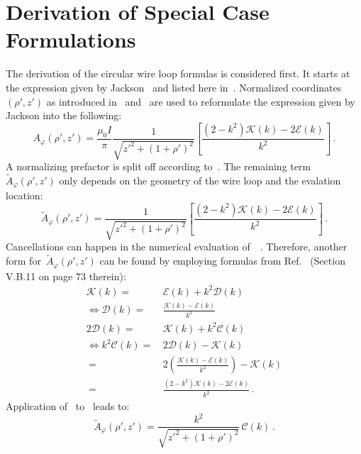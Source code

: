 \section{Derivation of Special Case Formulations}
\label{apx:derivation_of_special_case_formulations}
The derivation of the circular wire loop formulas is considered first.
It starts at the expression given by Jackson~\cite{jackson}
and listed here in~.
Normalized coordinates~$(\rho', z')$ as introduced in~ and~
are used to reformulate the expression given by Jackson into the following:
\begin{equation}
 A_\varphi(\rho', z')
   = \frac{\mu_0 I}{\pi}
     \frac{1}{\sqrt{z'^2 + (1 + \rho')^2}}
     \left[ \frac{(2 - k^2)\mathcal{K}(k) - 2 \mathcal{E}(k)}{k^2} \right] \, . \label{eqn:cwl_A_phi_initial}
\end{equation}
A normalizing prefactor is split off according to~.
The remaining term~$\tilde{A}_\varphi(\rho',z')$ only depends on the geometry of the wire loop
and the evalation location:
\begin{equation}
  \tilde{A}_\varphi(\rho', z')
  = \frac{1}{\sqrt{z'^2 + (1 + \rho')^2}}
    \left[ \frac{(2 - k^2)\mathcal{K}(k) - 2 \mathcal{E}(k)}{k^2} \right] \, . \label{eqn:aNormJackson}
\end{equation}
Cancellations can happen in the numerical evaluation of~~\cite{bulirsch_3}.
Therefore, another form for~$\tilde{A}_\varphi(\rho',z')$ can be found by employing
formulas from Ref.~\cite{jahnke_emde} (Section V.B.11 on page 73 therein):
\begin{align}
                 \mathcal{K}(k) =&\, \mathcal{E}(k) + k^2 \mathcal{D}(k) \nonumber \\
 \Leftrightarrow \mathcal{D}(k) =&\, \frac{\mathcal{K}(k) - \mathcal{E}(k)}{k^2} \\
               2 \mathcal{D}(k) =&\, \mathcal{K}(k) + k^2 \mathcal{C}(k) \nonumber \\
 \Leftrightarrow k^2 \mathcal{C}(k) =&\, 2 \mathcal{D}(k) - \mathcal{K}(k) \nonumber \\
                     ~              =&\, 2 \left( \frac{\mathcal{K}(k) - \mathcal{E}(k)}{k^2} \right) - \mathcal{K}(k) \nonumber \\
                     ~              =&\, \frac{(2 - k^2) \mathcal{K}(k) - 2 \mathcal{E}(k)}{k^2} \, . \label{eqn:kSqC}
\end{align}
Application of~ to~ leads to:
\begin{equation}
  \tilde{A}_\varphi(\rho', z')
  = \frac{k^2}{\sqrt{z'^2 + (1 + \rho')^2}} \,\mathcal{C}(k)\, .
\end{equation}
